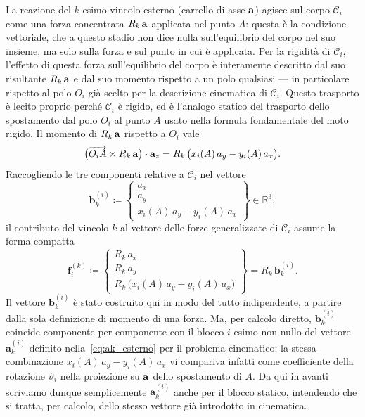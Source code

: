 La reazione del $k$-esimo vincolo esterno (carrello di asse
$\mathbf{a}$) agisce sul corpo $\mathcal{C}_i$ come una forza concentrata
$R_k\,\mathbf{a}$ applicata nel punto $A$: questa è la condizione
vettoriale, che a questo stadio non dice nulla sull'equilibrio del
corpo nel suo insieme, ma solo sulla forza e sul punto in cui è
applicata. Per la rigidità di $\mathcal{C}_i$, l'effetto di questa
forza sull'equilibrio del corpo è interamente descritto dal suo
risultante $R_k\,\mathbf{a}$ e dal suo momento rispetto a un polo
qualsiasi --- in particolare rispetto al polo $O_i$ già scelto per
la descrizione cinematica di $\mathcal{C}_i$. Questo trasporto è
lecito proprio perché $\mathcal{C}_i$ è rigido, ed è l'analogo
statico del trasporto dello spostamento dal polo $O_i$ al punto $A$
usato nella formula fondamentale del moto rigido. Il momento di
$R_k\,\mathbf{a}$ rispetto a $O_i$ vale
\begin{equation*}
	\bigl(\overrightarrow{O_i A} \times R_k\,\mathbf{a}\bigr)
	\cdot\mathbf{a}_z
	= R_k\,\bigl(x_i(A)\,a_y - y_i(A)\,a_x\bigr).
\end{equation*}
Raccogliendo le tre componenti relative a $\mathcal{C}_i$
nel vettore
\begin{equation}\label{eq:aki_def}
	\bm{b}_k^{(i)} \coloneqq
	\begin{Bmatrix}
		a_x \\[3pt] a_y \\[3pt]
		x_i(A)\,a_y - y_i(A)\,a_x
	\end{Bmatrix}
	\in \mathbb{R}^3,
\end{equation}
il contributo del vincolo $k$ al vettore delle forze
generalizzate di $\mathcal{C}_i$ assume la forma compatta
\begin{equation}\label{eq:contrib_rea_vett}
	\bm{f}_i^{(k)} \coloneqq
	\begin{Bmatrix}
		R_k\,a_x \\[3pt]
		R_k\,a_y \\[3pt]
		R_k\,\bigl(x_i(A)\,a_y - y_i(A)\,a_x\bigr)
	\end{Bmatrix}
	= R_k\,\bm{b}_k^{(i)}.
\end{equation}
Il vettore $\bm{b}_k^{(i)}$ è stato costruito qui in modo del
tutto indipendente, a partire dalla sola definizione di momento
di una forza. Ma, per calcolo diretto, $\bm{b}_k^{(i)}$ coincide
componente per componente con il blocco $i$-esimo non nullo del
vettore $\bm{a}_k^{(i)}$ definito nella~\eqref{eq:ak_esterno} per
il problema cinematico: la stessa combinazione
$x_i(A)\,a_y - y_i(A)\,a_x$ vi compariva infatti come coefficiente
della rotazione $\vartheta_i$ nella proiezione su $\mathbf{a}$ dello spostamento di $A$. Da qui in avanti scriviamo dunque semplicemente
$\bm{a}_k^{(i)}$ anche per il blocco statico, intendendo che si
tratta, per calcolo, dello stesso vettore già introdotto in
cinematica.
\medskip

